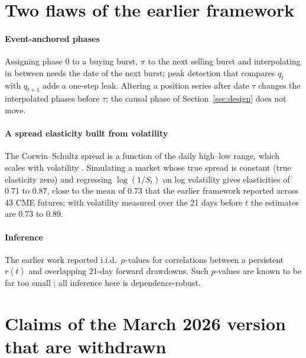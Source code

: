 \documentclass[preprint,12pt,authoryear]{elsarticle}
\begin{document}
\appendix
\section{Two flaws of the earlier framework}
\label{app:earlier}

\paragraph{Event-anchored phases} Assigning phase 0 to a buying burst, $\pi$
to the next selling burst and interpolating in between needs the date of the
next burst; peak detection that compares $q_t$ with $q_{t+1}$ adds a one-step
leak. Altering a position series after date $\tau$ changes the interpolated
phases before $\tau$; the causal phase of Section~\ref{sec:design} does not
move.

\paragraph{A spread elasticity built from volatility} The Corwin--Schultz
spread is a function of the daily high--low range, which scales with
volatility \citep{AbdiRanaldo2017}. Simulating a market whose true spread is
constant (true elasticity zero) and regressing $\log(1/S_t)$ on log
volatility gives elasticities of 0.71 to 0.87, close to the mean of 0.73
that the earlier framework reported across 43 CME futures; with volatility measured over the
21 days before $t$ the estimates are 0.73 to 0.89.

\paragraph{Inference} The earlier work reported i.i.d.\ $p$-values for
correlations between a persistent $r(t)$ and overlapping 21-day forward
drawdowns. Such $p$-values are known to be far too small
\citep{HansenHodrick1980,Valkanov2003}; all inference here is
dependence-robust.

\section{Claims of the March 2026 version that are withdrawn}
\label{app:withdrawn}
\end{document}
